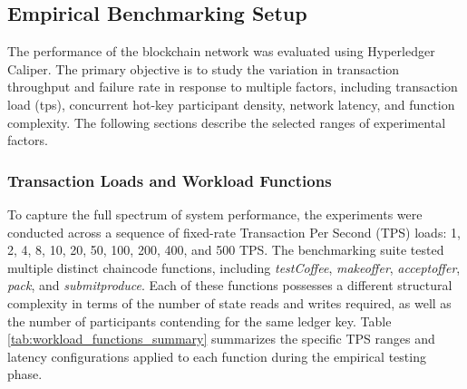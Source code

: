 \documentclass[12pt]{article}
\begin{document}
\subsection{Empirical Benchmarking Setup}



The performance of the blockchain network was evaluated using Hyperledger Caliper. The primary objective is to study the variation in transaction throughput and failure rate in response to multiple factors, including transaction load (tps), concurrent hot-key participant density, network latency, and function complexity. The following sections describe the selected ranges of experimental factors.

\subsubsection{Transaction Loads and Workload Functions}
To capture the full spectrum of system performance, the experiments were conducted across a sequence of fixed-rate Transaction Per Second (TPS) loads: 1, 2, 4, 8, 10, 20, 50, 100, 200, 400, and 500 TPS. The benchmarking suite tested multiple distinct chaincode functions, including \textit{testCoffee}, \textit{makeoffer}, \textit{acceptoffer}, \textit{pack}, and \textit{submitproduce}. Each of these functions possesses a different structural complexity in terms of the number of state reads and writes required, as well as the number of participants contending for the same ledger key. Table \ref{tab:workload_functions_summary} summarizes the specific TPS ranges and latency configurations applied to each function during the empirical testing phase.

\begin{table}[H]
\centering
\caption{Summary of Workload Functions and Empirical Testing Parameters}
\label{tab:workload_functions_summary}
\end{table}
\end{document}
